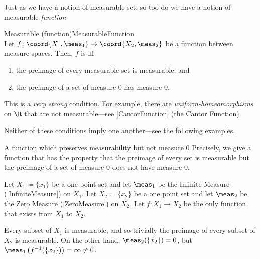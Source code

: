 Just as we have a notion of measurable set, so too do we have a notion of measurable \emph{function}
\begin{dfn}{Measurable (function)}{MeasurableFunction}
\\
Let $f\colon \coord{X_1,\meas _1}\rightarrow \coord{X_2,\meas _2}$ be a function between measure spaces.  Then, $f$ is  iff
\begin{enumerate}
\item \label{MeasurableFunction.i}the preimage of every measurable set is measurable; and
\item \label{MeasurableFunction.ii}the preimage of a set of measure $0$ has measure $0$.
\end{enumerate}
\begin{rmk}
This is a \emph{very strong} condition.  For example, there are \emph{uniform-homeomorphisms} on $\R$ that are not measurable---see \cref{CantorFunction} (the Cantor Function).
\end{rmk}
\begin{rmk}
Neither of these conditions imply one another---see the following examples.
\end{rmk}
\end{dfn}
\begin{exm}{A function which preserves measurability but not measure $0$}{}
Precisely, we give a function that has the property that the preimage of every set is measurable but the preimage of a set of measure $0$ does not have measure $0$.

Let $X_1\coloneqq \{ x_1\}$ be a one point set and let $\meas _1$ be the Infinite Measure (\cref{InfiniteMeasure}) on $X_1$.  Let $X_2\coloneqq \{ x_2\}$ be a one point set and let $\meas _2$ be the Zero Measure (\cref{ZeroMeasure}) on $X_2$.  Let $f\colon X_1\rightarrow X_2$ be the only function that exists from $X_1$ to $X_2$.

Every subset of $X_1$ is measurable, and so trivially the preimage of every subset of $X_2$ is measurable.  On the other hand, $\meas _2(\{ x_2\} )=0$, but $\meas _1\left( f^{-1}(\{ x_2\} )\right) =\infty \neq 0$.
\end{exm}
